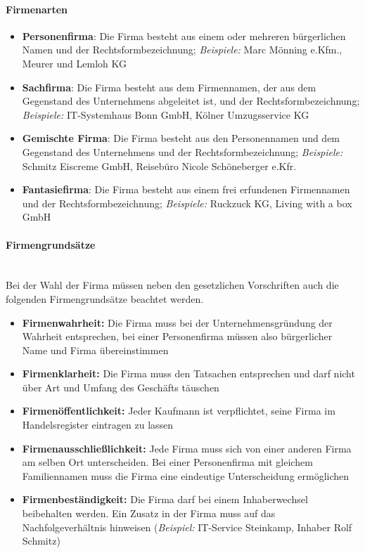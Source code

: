\paragraph{Firmenarten}
\begin{itemize}
\setlength\itemsep{0em}
	\item {\bf Personenfirma}: Die Firma besteht aus einem oder mehreren bürgerlichen Namen und der Rechtsformbezeichnung; {\it Beispiele:} Marc Mönning e.Kfm., Meurer und Lemloh KG
	\item {\bf Sachfirma}: Die Firma besteht aus dem Firmennamen, der aus dem Gegenstand des Unternehmens abgeleitet ist, und der Rechtsformbezeichnung; {\it Beispiele:} IT-Systemhaus Bonn GmbH, Kölner Umzugsservice KG
	\item {\bf Gemischte Firma}: Die Firma besteht aus den Personennamen und dem Gegenstand des Unternehmens und der Rechtsformbezeichnung; {\it Beispiele:} Schmitz Eiscreme GmbH, Reisebüro Nicole Schöneberger e.Kfr.
	\item {\bf Fantasiefirma}: Die Firma besteht aus einem frei erfundenen Firmennamen und der Rechtsformbezeichnung; {\it Beispiele:} Ruckzuck KG, Living with a box GmbH
\end{itemize}

\paragraph{Firmengrundsätze}~\\
Bei der Wahl der Firma müssen neben den gesetzlichen Vorschriften auch die folgenden Firmengrundsätze beachtet werden.

\begin{itemize}
\setlength\itemsep{0em}
	\item {\bf Firmenwahrheit:} Die Firma muss bei der Unternehmensgründung der Wahrheit entsprechen, bei einer Personenfirma müssen also bürgerlicher Name und Firma übereinstimmen
	\item {\bf Firmenklarheit:} Die Firma muss den Tatsachen entsprechen und darf nicht über Art und Umfang des Geschäfts täuschen
	\item {\bf Firmenöffentlichkeit:} Jeder Kaufmann ist verpflichtet, seine Firma im Handelsregister eintragen zu lassen
	\item {\bf Firmenausschließlichkeit:} Jede Firma muss sich von einer anderen Firma am selben Ort unterscheiden. Bei einer Personenfirma mit gleichem Familiennamen muss die Firma eine eindeutige Unterscheidung ermöglichen
	\item {\bf Firmenbeständigkeit:} Die Firma darf bei einem Inhaberwechsel beibehalten werden. Ein Zusatz in der Firma muss auf das Nachfolgeverhältnis hinweisen ({\it Beispiel:} IT-Service Steinkamp, Inhaber Rolf Schmitz)
\end{itemize}

